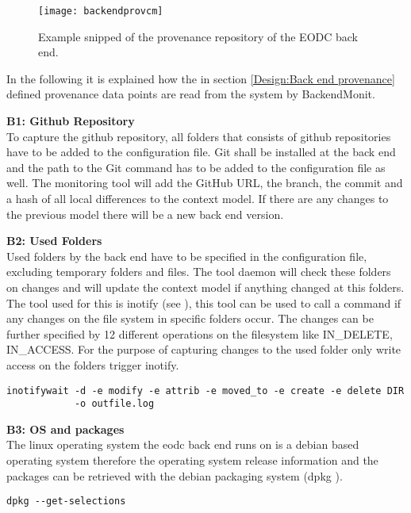 \documentclass[draft,final]{vutinfth} %
\begin{document}
\begin{figure}[h]
	\centering
	\texttt{[image: backendprovcm]}
	\caption{Example snipped of the provenance repository of the EODC back end.}
	\label{fig:backendprovcm} %
\end{figure}

In the following it is explained how the in section \ref{Design:Back end provenance} defined provenance data points are read from the system by BackendMonit.  

\textbf{B1: Github Repository} \\
To capture the github repository, all folders that consists of github repositories have to be added to the configuration file. Git shall be installed at the back end and the path to the Git command has to be added to the configuration file as well. The monitoring tool will add the GitHub URL, the branch, the commit and a hash of all local differences to the context model. If there are any changes to the previous model there will be a new back end version.  

\textbf{B2: Used Folders} \\
Used folders by the back end have to be specified in the configuration file, excluding temporary folders and files. The tool daemon will check these folders on changes and will update the context model if anything changed at this folders. The tool used for this is inotify (see \cite{inotify}), this tool can be used to call a command if any changes on the file system in specific folders occur. The changes can be further specified by 12 different operations on the filesystem like IN\_DELETE, IN\_ACCESS. For the purpose of capturing changes to the used folder only write access on the folders trigger inotify.

\begin{lstlisting}[frame=single]
inotifywait -d -e modify -e attrib -e moved_to -e create -e delete DIR 
			-o outfile.log
\end{lstlisting}

\textbf{B3: OS and packages} \\
The linux operating system the eodc back end runs on is a debian based\cite{debian} operating system therefore the operating system release information and the packages can be retrieved with the debian packaging system (dpkg \cite{dpkg}).

\begin{lstlisting}[frame=single]
dpkg --get-selections
\end{lstlisting}
\end{document}

